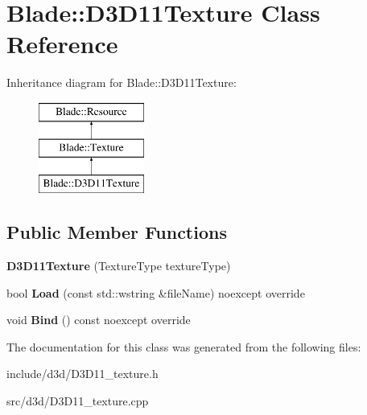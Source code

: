 \hypertarget{class_blade_1_1_d3_d11_texture}{}\section{Blade\+:\+:D3\+D11\+Texture Class Reference}
\label{class_blade_1_1_d3_d11_texture}
Inheritance diagram for Blade\+:\+:D3\+D11\+Texture\+:\begin{figure}[H]
\begin{center}
\leavevmode
\includegraphics[height=3.000000cm]{class_blade_1_1_d3_d11_texture}
\end{center}
\end{figure}
\subsection*{Public Member Functions}
\begin{DoxyCompactItemize}
\item 
\mbox{\label{class_blade_1_1_d3_d11_texture_ac8222f74d203b5780d6d17913d9397a7}} 
{\bfseries D3\+D11\+Texture} (Texture\+Type texture\+Type)
\item 
\mbox{\label{class_blade_1_1_d3_d11_texture_ae9f6d01709ba9db4085cf6b3d90b3ac7}} 
bool {\bfseries Load} (const std\+::wstring \&file\+Name) noexcept override
\item 
\mbox{\label{class_blade_1_1_d3_d11_texture_a1e0366d9294d0435d60076b6f9291c6c}} 
void {\bfseries Bind} () const noexcept override
\end{DoxyCompactItemize}


The documentation for this class was generated from the following files\+:\begin{DoxyCompactItemize}
\item 
include/d3d/D3\+D11\+\_\+texture.\+h\item 
src/d3d/D3\+D11\+\_\+texture.\+cpp\end{DoxyCompactItemize}
